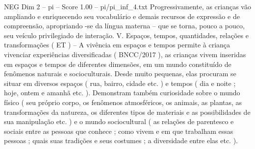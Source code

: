 \begin{textsample}{NEG Dim 2 – pi – Score 1.00 – pi/pi\_inf\_4.txt}
Progressivamente, as crianças vão ampliando e enriquecendo seu vocabulário e demais recursos de expressão e de compreensão, apropriando -se da língua materna – que se torna, pouco a pouco, seu veículo privilegiado de interação.
V.
Espaços, tempos, quantidades, relações e transformações ( ET ) – A vivência em espaços e tempos permite à criança vivenciar experiências diversificadas ( BNCC/2017 ), as crianças vivem inseridas em espaços e tempos de diferentes dimensões, em um mundo constituído de fenômenos naturais e socioculturais.
Desde muito pequenas, elas procuram se situar em diversos espaços ( rua, bairro, cidade etc. ) e tempos ( dia e noite ; hoje, ontem e amanhã etc. ).
Demonstram também curiosidade sobre o mundo físico ( seu próprio corpo, os fenômenos atmosféricos, os animais, as plantas, as transformações da natureza, os diferentes tipos de materiais e as possibilidades de sua manipulação etc. ) e o mundo sociocultural ( as relações de parentesco e sociais entre as pessoas que conhece ; como vivem e em que trabalham essas pessoas ; quais suas tradições e seus costumes ; a diversidade entre elas etc. ).

\end{textsample}
